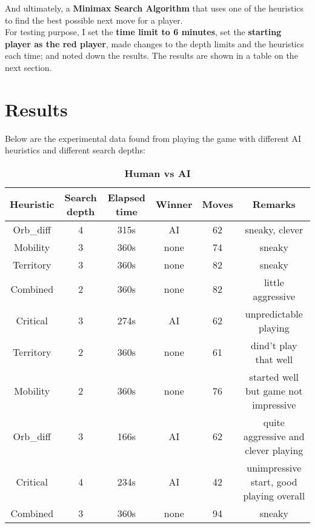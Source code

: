 \documentclass[a4paper, 13pt]{article}
\begin{document}
	And ultimately, a \textbf{Minimax Search Algorithm} that uses one of the heuristics to find the best possible next move for a player.\\
	
	 For testing purpose, I set the \textbf{time limit to 6 minutes}, set the \textbf{starting player as the red player}, made changes to the depth limits and the heuristics each time; and noted down the results. The results are shown in a table on the next section.
	 
	\vspace{0.5cm}
	\section*{Results}
		Below are the experimental data found from playing the game with different AI heuristics and different search depths:
		\pagebreak
		\begin{table}[!]
			\centering
			\caption{\textbf{Human vs AI}}
			\vspace{0.2cm}
			\small
			\begin{tabular}{| c | c | c | c | c | c |}
				\hline
				\textbf{Heuristic} & \textbf{Search depth} & \textbf{Elapsed time} & \textbf{Winner} & \textbf{Moves} & \textbf{Remarks}\\
				\hline
				Orb\_diff & 4 & 315s & AI & 62 & sneaky, clever\\
				\hline
				Mobility & 3 & 360s  & none & 74 & sneaky \textbf{}\\
				\hline
				Territory & 3 & 360s & none & 82 & sneaky \\
				\hline
				Combined & 2 & 360s & none & 82 & little aggressive \textbf{}\\
				\hline
				Critical & 3 & 274s & AI & 62 & unpredictable playing \\
				\hline
				Territory & 2 & 360s & none & 61 & dind't play that well  \\
				\hline
				Mobility & 2 & 360s & none & 76 & started well but game not impressive  \\
				\hline
				Orb\_diff & 3 & 166s & AI & 62 & quite aggressive and clever playing\\
				\hline
				Critical & 4 & 234s & AI & 42 & unimpressive start, good playing overall\\
				\hline
				Combined & 3 & 360s & none & 94 & sneaky \\
				\hline
			\end{tabular}
		\end{table}
		
\end{document}
